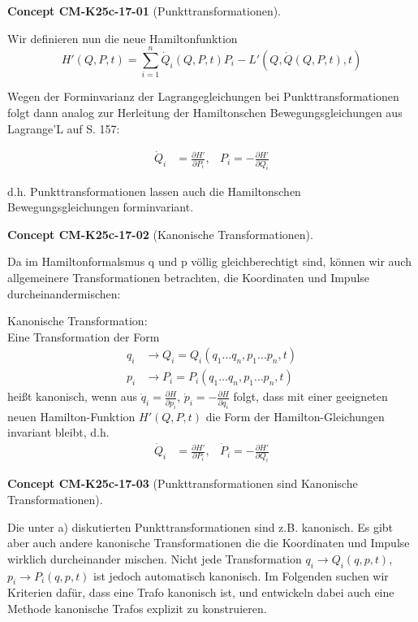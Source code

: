 \documentclass[10pt, letterpaper]{article}
\newcommand{\CustomHeading}[3]{%
  \par\medskip\noindent%
  \textbf{#1 #2} \textnormal{(#3)}.\enskip%
}
\newenvironment{CONC}[2]{\CustomHeading{Concept}{#1}{#2}}{}
\begin{document}
\begin{CONC}{CM-K25c-17-01}{Punkttransformationen}
Wir definieren nun die neue Hamiltonfunktion
\begin{equation*}
H'(Q,P,t) = \sum_{i=1}^n \dot{Q}_i(Q,P,t)P_i - L'(Q,\dot{Q}(Q,P,t),t)
\end{equation*}

Wegen der Forminvarianz der Lagrangegleichungen bei Punkttransformationen folgt dann analog zur Herleitung der Hamiltonschen Bewegungsgleichungen aus Lagrange'L auf S. 157:

\begin{align*}
\dot{Q}_i &= \frac{\partial H'}{\partial P_i}, & P_i = -\frac{\partial H'}{\partial Q_i}
\end{align*}

d.h. Punkttransformationen lassen auch die Hamiltonschen Bewegungsgleichungen forminvariant.
\end{CONC}

\begin{CONC}{CM-K25c-17-02}{Kanonische Transformationen}
Da im Hamiltonformalsmus q und p völlig gleichberechtigt sind, können wir auch allgemeinere Transformationen betrachten, die Koordinaten und Impulse durcheinandermischen:


Kanonische Transformation:\\
Eine Transformation der Form
\begin{align*}
q_i &\to Q_i = Q_i(q_1 \ldots q_n, p_1 \ldots p_n, t)\\
p_i &\to P_i = P_i(q_1 \ldots q_n, p_1 \ldots p_n, t)
\end{align*}
heißt kanonisch, wenn aus $\dot{q}_i = \frac{\partial H}{\partial p_i}$, $\dot{p}_i = -\frac{\partial H}{\partial q_i}$ folgt, dass mit einer geeigneten neuen Hamilton-Funktion $H'(Q,P,t)$ die Form der Hamilton-Gleichungen invariant bleibt, d.h.
\begin{align*}
\dot{Q}_i &= \frac{\partial H'}{\partial P_i}, & \dot{P}_i = -\frac{\partial H'}{\partial Q_i}
\end{align*}
\end{CONC}

\begin{CONC}{CM-K25c-17-03}{Punkttransformationen sind Kanonische Transformationen}
Die unter a) diskutierten Punkttransformationen sind z.B. kanonisch. Es gibt aber auch andere kanonische Transformationen die die Koordinaten und Impulse wirklich durcheinander mischen. Nicht jede Transformation $q_i \to Q_i(q,p,t)$, $p_i \to P_i(q,p,t)$ ist jedoch automatisch kanonisch. Im Folgenden suchen wir Kriterien dafür, dass eine Trafo kanonisch ist, und entwickeln dabei auch eine Methode kanonische Trafos explizit zu konstruieren.
\end{CONC}
\end{document}
